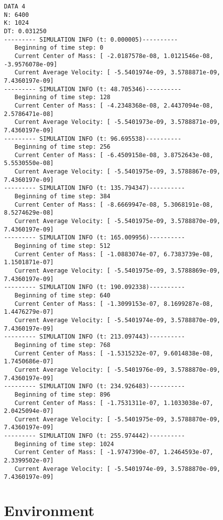 \documentclass[11pt]{article}
\begin{document}
\begin{verbatim}
DATA 4
N: 6400
K: 1024
DT: 0.031250
--------- SIMULATION INFO (t: 0.000005)----------
   Beginning of time step: 0
   Current Center of Mass: [ -2.0187578e-08, 1.0121546e-08, -3.9576078e-09]
   Current Average Velocity: [ -5.5401974e-09, 3.5788871e-09, 7.4360197e-09]
--------- SIMULATION INFO (t: 48.705346)----------
   Beginning of time step: 128
   Current Center of Mass: [ -4.2348368e-08, 2.4437094e-08, 2.5786471e-08]
   Current Average Velocity: [ -5.5401973e-09, 3.5788871e-09, 7.4360197e-09]
--------- SIMULATION INFO (t: 96.695538)----------
   Beginning of time step: 256
   Current Center of Mass: [ -6.4509158e-08, 3.8752643e-08, 5.5530550e-08]
   Current Average Velocity: [ -5.5401975e-09, 3.5788867e-09, 7.4360197e-09]
--------- SIMULATION INFO (t: 135.794347)----------
   Beginning of time step: 384
   Current Center of Mass: [ -8.6669947e-08, 5.3068191e-08, 8.5274629e-08]
   Current Average Velocity: [ -5.5401975e-09, 3.5788870e-09, 7.4360197e-09]
--------- SIMULATION INFO (t: 165.009956)----------
   Beginning of time step: 512
   Current Center of Mass: [ -1.0883074e-07, 6.7383739e-08, 1.1501871e-07]
   Current Average Velocity: [ -5.5401975e-09, 3.5788869e-09, 7.4360197e-09]
--------- SIMULATION INFO (t: 190.092338)----------
   Beginning of time step: 640
   Current Center of Mass: [ -1.3099153e-07, 8.1699287e-08, 1.4476279e-07]
   Current Average Velocity: [ -5.5401974e-09, 3.5788870e-09, 7.4360197e-09]
--------- SIMULATION INFO (t: 213.097443)----------
   Beginning of time step: 768
   Current Center of Mass: [ -1.5315232e-07, 9.6014838e-08, 1.7450686e-07]
   Current Average Velocity: [ -5.5401976e-09, 3.5788870e-09, 7.4360197e-09]
--------- SIMULATION INFO (t: 234.926483)----------
   Beginning of time step: 896
   Current Center of Mass: [ -1.7531311e-07, 1.1033038e-07, 2.0425094e-07]
   Current Average Velocity: [ -5.5401975e-09, 3.5788870e-09, 7.4360197e-09]
--------- SIMULATION INFO (t: 255.974442)----------
   Beginning of time step: 1024
   Current Center of Mass: [ -1.9747390e-07, 1.2464593e-07, 2.3399502e-07]
   Current Average Velocity: [ -5.5401974e-09, 3.5788870e-09, 7.4360197e-09]
\end{verbatim}

\section{Environment}
\label{sec:org77f9ede}
\end{document}
